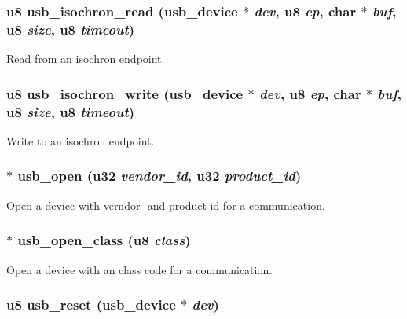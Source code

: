 \subsubsection{\setlength{\rightskip}{0pt plus 5cm}u8 usb\_\-isochron\_\-read ({\bf usb\_\-device} $\ast$ {\em dev}, u8 {\em ep}, char $\ast$ {\em buf}, u8 {\em size}, u8 {\em timeout})}\label{usb_8h_2764be421f5db3fe7546ef8d591f39e5}


Read from an isochron endpoint. 
\subsubsection{\setlength{\rightskip}{0pt plus 5cm}u8 usb\_\-isochron\_\-write ({\bf usb\_\-device} $\ast$ {\em dev}, u8 {\em ep}, char $\ast$ {\em buf}, u8 {\em size}, u8 {\em timeout})}\label{usb_8h_c36bbab7df127d7d2076bc04b3a12a40}


Write to an isochron endpoint. 
\subsubsection{$\ast$ usb\_\-open (u32 {\em vendor\_\-id}, u32 {\em product\_\-id})}\label{usb_8h_b1ab8d31ba6bf15352c1b62500f7ec7d}


Open a device with verndor- and product-id for a communication. 
\subsubsection{$\ast$ usb\_\-open\_\-class (u8 {\em class})}\label{usb_8h_52c2bd3e63f3188fba38052e833f5afd}


Open a device with an class code for a communication. 
\subsubsection{\setlength{\rightskip}{0pt plus 5cm}u8 usb\_\-reset ({\bf usb\_\-device} $\ast$ {\em dev})}\label{usb_8h_cabbd669fcfbbd1ff806b37344c0486e}


